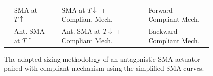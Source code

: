 \begin{figure}[ht] %
  \centering
  \begin{tabular}{l@{ }l l@{ }l l@{ }l}
    {\color{myred} \rule[2pt]{10pt}{0.5mm} } & {\footnotesize SMA at $T\uparrow$} & {\color{myblue} \rule[2pt]{10pt}{0.5mm} } & {\footnotesize SMA at $T\downarrow$ + Compliant Mech.} & {\color{mygreen} \rule[2pt]{10pt}{0.5mm} } & {\footnotesize Forward Compliant Mech.}\\
    {\color{myred} \dottedrule} & {\footnotesize Ant. SMA at $T\uparrow$} & {\color{myblue} \dottedrule } & {\footnotesize Ant. SMA at $T\downarrow$ + Compliant Mech.} & {\color{mygreen} \dottedrule } & {\footnotesize Backward Compliant Mech.}\\
  \end{tabular}
  \caption{The adapted sizing methodology of an antagonistic SMA actuator paired with compliant mechanism using the simplified SMA curves.}
  \label{fig:smaactwp-bb}
\end{figure}

